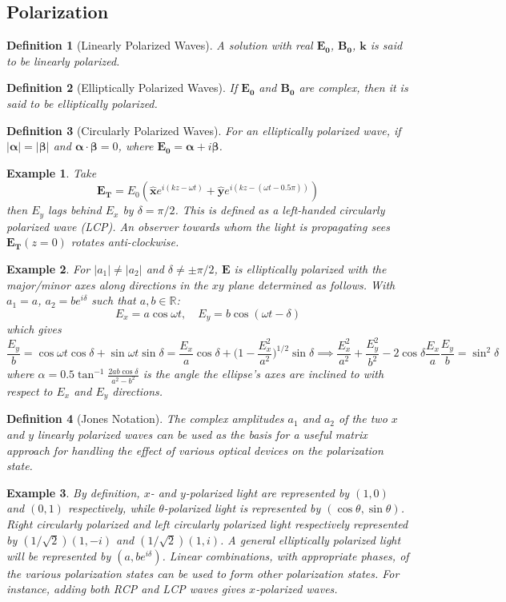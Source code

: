 \documentclass[a4paper]{article}
\newtheorem{eg}{Example}[section]
\theoremstyle{new}
\newtheorem{defi}{Definition}[section]
\begin{document}
\subsection{Polarization}
\begin{defi}[Linearly Polarized Waves]
A solution with real $\mathbf{E_0}$, $\mathbf{B_0}$, $\mathbf{k}$ is said to be linearly polarized.
\end{defi}
\begin{defi}[Elliptically Polarized Waves]
If $\mathbf{E_0}$ and $\mathbf{B_0}$ are complex, then it is said to be elliptically polarized.
\end{defi}
\begin{defi}[Circularly Polarized Waves]
For an elliptically polarized wave, if $|\boldsymbol{\alpha}| = |\boldsymbol{\beta}|$ and $\boldsymbol{\alpha}\cdot\boldsymbol{\beta}=0$, where $\mathbf{E_0}=\boldsymbol{\alpha}+i\boldsymbol{\beta}$.
\end{defi}
\begin{eg}
Take
$$\mathbf{E_T}=E_0(\mathbf{\hat{x}}e^{i(kz-\omega t)}+\mathbf{\hat{y}}e^{i(kz-(\omega t-0.5\pi))})$$
then $E_y$ lags behind $E_x$ by $\delta=\pi/2$. This is defined as a left-handed circularly polarized wave (LCP). An observer towards whom the light is propagating sees $\mathbf{E_T}(z=0)$ rotates anti-clockwise.
\end{eg}
\begin{eg}
For $|a_1|\neq|a_2|$ and $\delta\neq\pm\pi/2$, $\mathbf{E}$ is elliptically polarized with the major/minor axes along directions in the $xy$ plane determined as follows. With $a_1=a$, $a_2=be^{i\delta}$ such that $a,b\in\mathbb{R}$:
$$E_x=a\cos\omega t,\quad E_y=b\cos(\omega t-\delta)$$
which gives
$$\frac{E_y}{b}=\cos\omega t\cos\delta+\sin\omega t\sin\delta=\frac{E_x}{a}\cos\delta+\bigg(1-\frac{E_x^2}{a^2}\bigg)^{1/2}\sin\delta\implies\frac{E_x^2}{a^2}+\frac{E_y^2}{b^2}-2\cos\delta\frac{E_x}{a}\frac{E_y}{b}=\sin^2\delta$$
where $\alpha=0.5\tan^{-1}\frac{2ab\cos\delta}{a^2-b^2}$ is the angle the ellipse's axes are inclined to with respect to $E_x$ and $E_y$ directions.
\end{eg}
\begin{defi}[Jones Notation]
The complex amplitudes $a_1$ and $a_2$ of the two $x$ and $y$ linearly polarized waves can be used as the basis for a useful matrix approach for handling the effect of various optical devices on the polarization state.
\end{defi}
\begin{eg}
By definition, $x$- and $y$-polarized light are represented by $(1,0)$ and $(0,1)$ respectively, while $\theta$-polarized light is represented by $(\cos\theta,\sin\theta)$. Right circularly polarized and left circularly polarized light respectively represented by $(1/\sqrt{2})(1,-i)$ and $(1/\sqrt{2})(1,i)$. A general elliptically polarized light will be represented by $(a,be^{i\delta})$. Linear combinations, with appropriate phases, of the various polarization states can be used to form other polarization states. For instance, adding both RCP and LCP waves gives $x$-polarized waves.
\end{eg}
\end{document}
